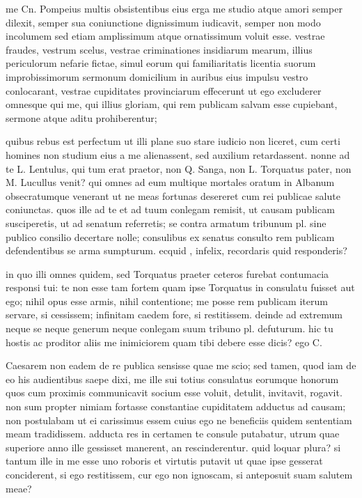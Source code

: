  me Cn. Pompeius multis obsistentibus eius erga me studio atque amori semper dilexit, semper sua coniunctione dignissimum iudicavit, semper non modo incolumem sed etiam amplissimum atque ornatissimum voluit esse. vestrae fraudes, vestrum scelus, vestrae criminationes insidiarum mearum, illius periculorum nefarie fictae, simul eorum qui familiaritatis licentia suorum improbissimorum sermonum domicilium in auribus eius impulsu vestro conlocarant, vestrae cupiditates provinciarum effecerunt ut ego excluderer omnesque qui me, qui illius gloriam, qui rem publicam salvam esse cupiebant, sermone atque aditu prohiberentur;

 quibus rebus est perfectum ut illi plane suo stare iudicio non liceret, cum certi homines non studium eius a me alienassent, sed auxilium retardassent. nonne ad te L. Lentulus, qui tum erat praetor, non Q. Sanga, non L. Torquatus pater, non M. Lucullus venit? qui omnes ad eum multique mortales oratum in Albanum obsecratumque venerant ut ne meas fortunas desereret cum rei publicae salute coniunctas. quos ille ad te et ad tuum conlegam remisit, ut causam publicam susciperetis, ut ad senatum referretis; se contra armatum tribunum pl. sine publico consilio decertare nolle; consulibus ex senatus consulto rem publicam defendentibus se arma sumpturum. ecquid , infelix, recordaris quid responderis?

 in quo illi omnes quidem, sed Torquatus praeter ceteros furebat contumacia responsi tui: te non esse tam fortem quam ipse Torquatus in consulatu fuisset aut ego; nihil opus esse armis, nihil contentione; me posse rem publicam iterum servare, si cessissem; infinitam caedem fore, si restitissem. deinde ad extremum neque se neque generum neque conlegam suum tribuno pl. defuturum. hic tu hostis ac proditor aliis me inimiciorem quam tibi debere esse dicis? ego C.

 Caesarem non eadem de re publica sensisse quae me scio; sed tamen, quod iam de eo his audientibus saepe dixi, me ille sui totius consulatus eorumque honorum quos cum proximis communicavit socium esse voluit, detulit, invitavit, rogavit. non sum propter nimiam fortasse constantiae cupiditatem adductus ad causam; non postulabam ut ei carissimus essem cuius ego ne beneficiis quidem sententiam meam tradidissem. adducta res in certamen te consule putabatur, utrum quae superiore anno ille gessisset manerent, an rescinderentur. quid loquar plura? si tantum ille in me esse uno roboris et virtutis putavit ut quae ipse gesserat conciderent, si ego restitissem, cur ego non ignoscam, si anteposuit suam salutem meae?

